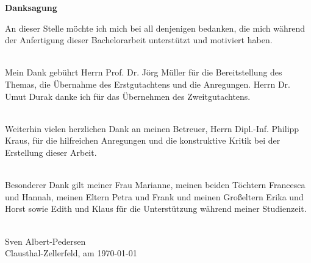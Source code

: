 \newpage
\thispagestyle{empty}
\begin{center}
\LARGE\bfseries Danksagung\linebreak[4]
\end{center}


An dieser Stelle möchte ich mich bei all denjenigen bedanken, die mich während der Anfertigung dieser Bachelorarbeit unterstützt und motiviert haben. \\\

Mein Dank gebührt Herrn Prof. Dr. Jörg Müller für die Bereitstellung des Themas, die Übernahme des Erstgutachtens und die Anregungen.
Herrn Dr. Umut Durak danke ich für das Übernehmen des Zweitgutachtens. \\\

Weiterhin vielen herzlichen Dank an meinen Betreuer, Herrn Dipl.-Inf. Philipp Kraus, für die hilfreichen Anregungen und die konstruktive Kritik bei der Erstellung dieser Arbeit. \\\

Besonderer Dank gilt meiner Frau Marianne, meinen beiden Töchtern Francesca und Hannah, meinen Eltern Petra und Frank und meinen Großeltern Erika und Horst sowie Edith und Klaus für die Unterstützung während meiner Studienzeit.  \\\


Sven Albert-Pedersen\\
Clausthal-Zellerfeld, am \today

